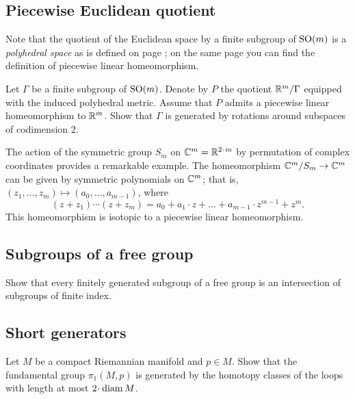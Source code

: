 \subsection*{Piecewise Euclidean quotient}\label{Piecewise Euclidean quotient}

Note that the quotient of the Euclidean space by a finite subgroup of $\mathrm{SO}(m)$ is a {}\emph{polyhedral space} as is defined on page \pageref{piecewise linear map};
on the same page you can find the definition of piecewise linear homeomorphism.


\begin{pr}
Let $\Gamma$ be a finite subgroup of $\mathrm{SO}(m)$.
Denote by $P$ the quotient $\mathbb{R}^m/\Gamma$ equipped with the induced
polyhedral metric.
Assume that $P$ admits a piecewise linear homeomorphism to $\mathbb{R}^m$.
Show that $\Gamma$ is generated by rotations  around subspaces of codimension $2$.
\end{pr}

The action of the symmetric group $S_m$ on $\CC^m=\RR^{2\cdot m}$ by permutation of complex coordinates provides a remarkable example.
The homeomorphism $\mathbb{C}^m/S_m\to \mathbb{C}^m$ can be given by symmetric polynomials on $\mathbb{C}^m$;
that is, $(z_1,\dots,z_m)\mapsto (a_0,\dots,a_{m-1})$, where
\[(z+z_1)\cdots(z+z_m)=a_0+a_1\cdot z+\dots+a_{m-1}\cdot z^{m-1}+z^m.\]
This homeomorphism is isotopic to a piecewise linear homeomorphism.

\subsection*{Subgroups of a free group}\label{Subgroups of free group} 

\begin{pr}
Show that every finitely generated subgroup of a free group 
is an intersection of subgroups of finite index.
\end{pr}

\subsection*{Short generators\easy}\label{Lengths of generators of the fundamental group}

\begin{pr}
Let $M$ be a compact Riemannian manifold and $p\in M$.
Show that the fundamental group $\pi_1(M,p)$
is generated by the homotopy classes of the loops with length at most $2\cdot\diam M$.
\end{pr}

